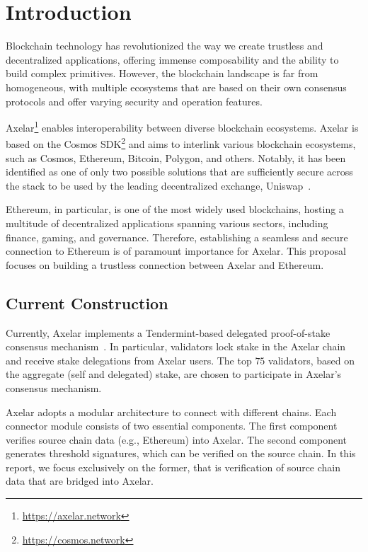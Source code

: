 \section{Introduction}
Blockchain technology has revolutionized the way we create trustless and decentralized applications, offering immense composability and the ability to build complex primitives. However, the blockchain landscape is far from homogeneous, with multiple ecosystems that are based on their own consensus protocols and offer varying security and operation features. 

Axelar\footnote{\url{https://axelar.network}} enables interoperability between diverse blockchain ecosystems. Axelar is based on the Cosmos SDK\footnote{\url{https://cosmos.network}} and aims to interlink various blockchain ecosystems, such as Cosmos, Ethereum, Bitcoin, Polygon, and others. Notably, it has been identified as one of only two possible solutions that are sufficiently secure across the stack to be used by the leading decentralized exchange, Uniswap~\cite{uniswap-report}.

Ethereum, in particular, is one of the most widely used blockchains, hosting a multitude of decentralized applications spanning various sectors, including finance, gaming, and governance\cite{wood,buterin}. Therefore, establishing a seamless and secure connection to Ethereum is of paramount importance for Axelar. This proposal focuses on building a trustless connection between Axelar and Ethereum.

\subsection{Current Construction}
Currently, Axelar implements a Tendermint-based delegated proof-of-stake consensus mechanism~\cite{axelar-whitepaper,buchman2019latest}. In particular, validators lock stake in the Axelar chain and receive stake delegations from Axelar users. The top $75$ validators, based on the aggregate (self and delegated) stake, are chosen to participate in Axelar's consensus mechanism.

Axelar adopts a modular architecture to connect with different chains. Each connector module consists of two essential components. The first component verifies source chain data (e.g., Ethereum) into Axelar. The second component generates threshold signatures, which can be verified on the source chain. In this report, we focus exclusively on the former, that is verification of source chain data that are bridged into Axelar.

